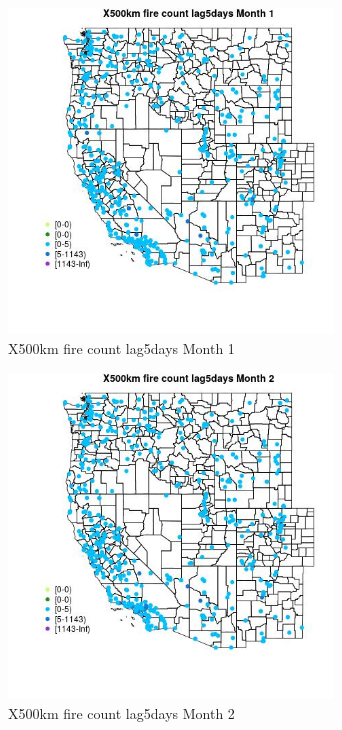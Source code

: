 \begin{figure} 
\centering  
\includegraphics[width=0.77\textwidth]{Code_Outputs/Report_ML_input_PM25_Step4_part_e_de_duplicated_aves_compiled_2019-05-14wNAs_MapObsMo1X500km_fire_count_lag5days.jpg} 
\caption{\label{fig:Report_ML_input_PM25_Step4_part_e_de_duplicated_aves_compiled_2019-05-14wNAsMapObsMo1X500km_fire_count_lag5days}X500km fire count lag5days Month 1} 
\end{figure} 
 

\begin{figure} 
\centering  
\includegraphics[width=0.77\textwidth]{Code_Outputs/Report_ML_input_PM25_Step4_part_e_de_duplicated_aves_compiled_2019-05-14wNAs_MapObsMo2X500km_fire_count_lag5days.jpg} 
\caption{\label{fig:Report_ML_input_PM25_Step4_part_e_de_duplicated_aves_compiled_2019-05-14wNAsMapObsMo2X500km_fire_count_lag5days}X500km fire count lag5days Month 2} 
\end{figure} 
 

